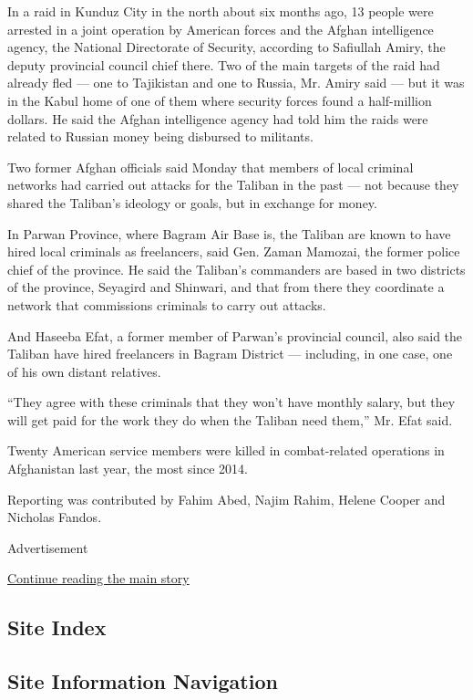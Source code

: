 In a raid in Kunduz City in the north about six months ago, 13 people
were arrested in a joint operation by American forces and the Afghan
intelligence agency, the National Directorate of Security, according to
Safiullah Amiry, the deputy provincial council chief there. Two of the
main targets of the raid had already fled --- one to Tajikistan and one
to Russia, Mr. Amiry said --- but it was in the Kabul home of one of
them where security forces found a half-million dollars. He said the
Afghan intelligence agency had told him the raids were related to
Russian money being disbursed to militants.

Two former Afghan officials said Monday that members of local criminal
networks had carried out attacks for the Taliban in the past --- not
because they shared the Taliban's ideology or goals, but in exchange for
money.

In Parwan Province, where Bagram Air Base is, the Taliban are known to
have hired local criminals as freelancers, said Gen. Zaman Mamozai, the
former police chief of the province. He said the Taliban's commanders
are based in two districts of the province, Seyagird and Shinwari, and
that from there they coordinate a network that commissions criminals to
carry out attacks.

And Haseeba Efat, a former member of Parwan's provincial council, also
said the Taliban have hired freelancers in Bagram District ---
including, in one case, one of his own distant relatives.

``They agree with these criminals that they won't have monthly salary,
but they will get paid for the work they do when the Taliban need
them,'' Mr. Efat said.

Twenty American service members were killed in combat-related operations
in Afghanistan last year, the most since 2014.

Reporting was contributed by Fahim Abed, Najim Rahim, Helene Cooper and
Nicholas Fandos.

Advertisement

\protect\hyperlink{after-bottom}{Continue reading the main story}

\hypertarget{site-index}{%
\subsection{Site Index}\label{site-index}}

\hypertarget{site-information-navigation}{%
\subsection{Site Information
Navigation}\label{site-information-navigation}}

